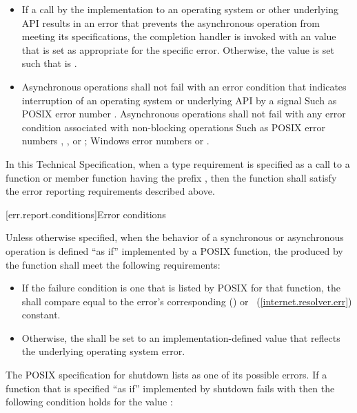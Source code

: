 \begin{itemize}
\item
If a call by the implementation to an operating system or other underlying API results in an error that prevents the asynchronous operation from meeting its specifications, the completion handler is invoked with an  value  that is set as appropriate for the specific error. Otherwise, the  value  is set such that  is .

\item
Asynchronous operations shall not fail with an error condition that indicates interruption of an operating system or underlying API by a signal \enternote Such as POSIX error number  \exitnote . Asynchronous operations shall not fail with any error condition associated with non-blocking operations \enternote Such as POSIX error numbers , , or ; Windows error numbers  or  \exitnote .
\end{itemize}

\pnum
In this Technical Specification, when a type requirement is specified as a call to a function or member function having the prefix , then the function shall satisfy the error reporting requirements described above.



[err.report.conditions]{Error conditions}

\pnum
Unless otherwise specified, when the behavior of a synchronous or asynchronous operation is defined ``as if'' implemented by a POSIX function, the  produced by the function shall meet the following requirements:

\begin{itemize}
\item
If the failure condition is one that is listed by POSIX for that function, the  shall compare equal to the error's corresponding  () or ~(\ref{internet.resolver.err}) constant.

\item
Otherwise, the  shall be set to an implementation-defined value that reflects the underlying operating system error.
\end{itemize}

\pnum
\enterexample The POSIX specification for shutdown lists  as one of its possible errors. If a function that is specified ``as if'' implemented by shutdown fails with  then the following condition holds for the  value :  \exitexample

